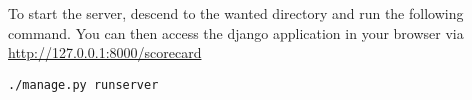 To start the server, descend to the wanted directory and run the following command. You can then access the django application in your browser via \url{http://127.0.0.1:8000/scorecard}
\begin{lstlisting}[style=Bash, caption=Run development server, label=lst:run_server]
./manage.py runserver
\end{lstlisting}